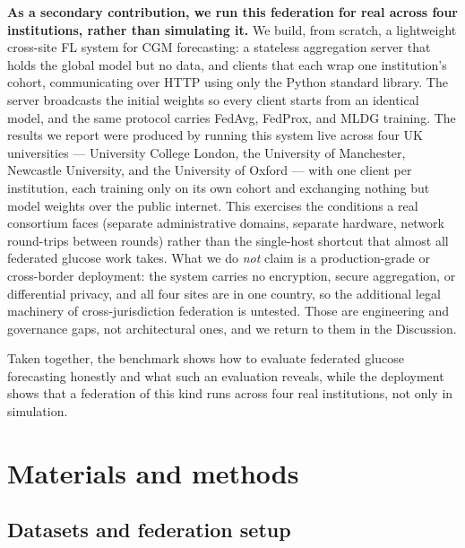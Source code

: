 \documentclass[10pt,letterpaper]{article}
\begin{document}
\textbf{As a secondary contribution, we run this federation for real across four
institutions, rather than simulating it.} We build, from scratch, a lightweight
cross-site FL system for CGM forecasting: a stateless aggregation server that
holds the global model but no data, and clients that each wrap one institution's
cohort, communicating over HTTP using only the Python standard library. The server
broadcasts the initial weights so every client starts from an identical model, and
the same protocol carries FedAvg, FedProx, and MLDG training. The results we
report were produced by running this system live across four UK universities ---
University College London, the University of Manchester, Newcastle University, and
the University of Oxford --- with one client per institution, each training only on
its own cohort and exchanging nothing but model weights over the public internet.
This exercises the conditions a real consortium faces (separate administrative
domains, separate hardware, network round-trips between rounds) rather than the
single-host shortcut that almost all federated glucose work takes. What we do
\emph{not} claim is a production-grade or cross-border deployment: the system
carries no encryption, secure aggregation, or differential privacy, and all four
sites are in one country, so the additional legal machinery of cross-jurisdiction
federation is untested. Those are engineering and governance gaps, not
architectural ones, and we return to them in the Discussion.

Taken together, the benchmark shows how to evaluate federated glucose forecasting
honestly and what such an evaluation reveals, while the deployment shows that a
federation of this kind runs across four real institutions, not only in
simulation.

\section*{Materials and methods}

\subsection*{Datasets and federation setup}
\end{document}
